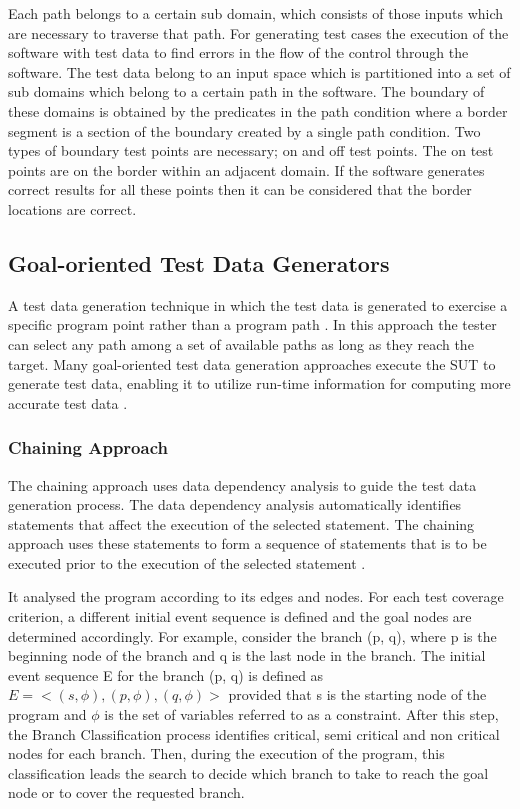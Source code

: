 Each path belongs to a certain sub domain, which consists of those inputs which are necessary to traverse that path. For generating test cases the execution of the software with test data to find errors in the flow of the control through the software. The test data belong to an input space which is partitioned into a set of sub domains which belong to a certain path in the software. The boundary of these domains is obtained by the predicates in the path condition where a border segment is a section of the boundary created by a single path condition. Two types of boundary test points are necessary; on and off test points. The on test points are on the border within an adjacent domain. If the software generates correct results for all these points then it can be considered that the border locations are correct.



\subsection{Goal-oriented Test Data Generators}
A test data generation technique in which the test data is generated to exercise a specific program point rather than a program path \cite{chungautomated}.  In this approach the tester can select any path among a set of available paths as long as they reach the target. Many goal-oriented test data generation approaches execute the SUT to generate test data, enabling it to utilize run-time information for computing more accurate test data \cite{ferguson1996chaining}.

\subsubsection{Chaining Approach}
The chaining approach uses data dependency analysis to guide the test data generation process. The data dependency analysis automatically identifies statements that affect the execution of the selected statement. The chaining approach uses these statements to form a sequence of statements that is to be executed prior to the execution of the selected statement \cite{ferguson1996chaining}.

It analysed the program according to its edges and nodes. For each test coverage criterion, a different initial event sequence is defined and the goal nodes are determined accordingly. For example, consider  the branch (p, q), where p is  the beginning node of the branch and q is the last node in the branch. The initial event sequence E for the branch (p, q) is defined as $E =< (s,\phi), (p,\phi),(q,\phi) >$ provided that s is the starting node of the program and $\phi$ is the set of variables referred to as a constraint. After this step, the Branch Classification process identifies critical, semi critical and non critical nodes for each branch. Then, during the execution of the program, this classification leads the search to decide which branch to take to reach the goal node or to cover the requested branch.  


